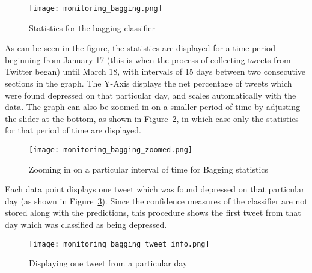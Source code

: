 \begin{figure}
    \centering
    \texttt{[image: monitoring\_bagging.png]}
    \caption{Statistics for the bagging classifier}
    \label{fig:monitoring_bagging}
\end{figure}

As can be seen in the figure, the statistics are displayed for a time period beginning from January 17 (this is when the process of collecting tweets from Twitter began) until March 18, with intervals of 15 days between two consecutive sections in the graph. The Y-Axis displays the net percentage of tweets which were found depressed on that particular day, and scales automatically with the data.  The graph can also be zoomed in on a smaller period of time by adjusting the slider at the bottom, as shown in Figure~\ref{fig:monitoring_bagging_zoomed}, in which case only the statistics for that period of time are displayed.\\

\begin{figure}
    \centering
    \texttt{[image: monitoring\_bagging\_zoomed.png]}
    \caption{Zooming in on a particular interval of time for Bagging statistics}
    \label{fig:monitoring_bagging_zoomed}
\end{figure}

Each data point displays one tweet which was found depressed on that particular day (as shown in Figure~\ref{fig:monitoring_bagging_tweet_info}). Since the confidence measures of the classifier are not stored along with the predictions, this procedure shows the first tweet from that day which was classified as being depressed.

\begin{figure}
    \centering
    \texttt{[image: monitoring\_bagging\_tweet\_info.png]}
    \caption{Displaying one tweet from a particular day}
    \label{fig:monitoring_bagging_tweet_info}
\end{figure}
